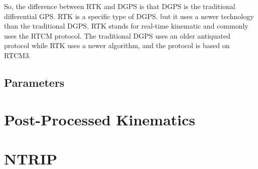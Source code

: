 So, the difference between RTK and DGPS is that DGPS is the traditional differential GPS.
RTK is a specific type of DGPS.
but it uses a newer technology than the traditional DGPS.
RTK stands for real-time kinematic and commonly uses the RTCM protocol.
The traditional DGPS uses an older antiquated protocol while RTK uses a newer algorithm, and the protocol is based on RTCM3. 

\subsection{Parameters}\label{sec:II_rtk_parameters}

\section{Post-Processed Kinematics}\label{sec:II_ppk}

\section{NTRIP}\label{sec:II_ntrip}






